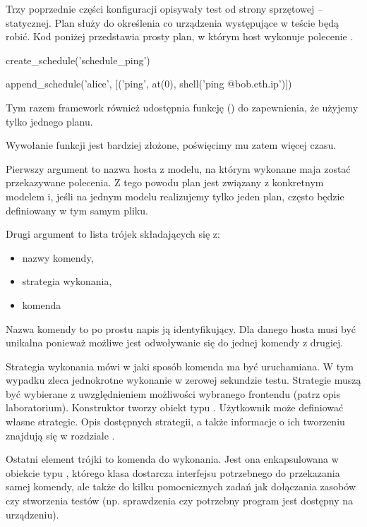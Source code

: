 \documentclass[00-praca-magisterska.tex]{subfiles}
\begin{document}
Trzy poprzednie części konfiguracji opisywały test od strony sprzętowej --
statycznej. Plan służy do określenia co urządzenia występujące w teście będą
robić. Kod poniżej przedstawia prosty plan, w którym host wykonuje polecenie
.

\begin{pythoncode}
  create_schedule('schedule_ping')

  append_schedule('alice', [('ping', at(0), shell('ping @{bob.eth.ip}')])
\end{pythoncode}

Tym razem framework również udostępnia funkcję () do
zapewnienia, że użyjemy tylko jednego planu.

Wywołanie funkcji  jest bardziej złożone, poświęcimy mu
zatem więcej czasu.

Pierwszy argument to nazwa hosta z modelu, na którym wykonane maja zostać
przekazywane polecenia. Z tego powodu plan jest związany z konkretnym modelem
i, jeśli na jednym modelu realizujemy tylko jeden plan, często będzie
definiowany w tym samym pliku.

Drugi argument to lista trójek składających się z:
\begin{itemize}
\item nazwy komendy,
\item strategia wykonania,
\item komenda
\end{itemize}

Nazwa komendy to po prostu napis ją identyfikujący. Dla danego hosta musi być
unikalna ponieważ możliwe jest odwoływanie się do jednej komendy z drugiej.

Strategia wykonania mówi w jaki sposób komenda ma być uruchamiana. W tym
wypadku  zleca jednokrotne wykonanie w zerowej sekundzie testu.
Strategie muszą być wybierane z uwzględnieniem możliwości wybranego frontendu
(patrz opis laboratorium). Konstruktor  tworzy obiekt typu
. Użytkownik może definiować własne strategie. Opis dostępnych
strategii, a także informacje o ich tworzeniu znajdują się w rozdziale
.

Ostatni element trójki to komenda do wykonania. Jest ona enkapsulowana w
obiekcie typu , którego klasa dostarcza interfejsu
potrzebnego do przekazania samej komendy, ale także do kilku pomocnicznych
zadań jak dołączania zasobów czy stworzenia testów (np. sprawdzenia czy
potrzebny program jest dostępny na urządzeniu).
\end{document}
